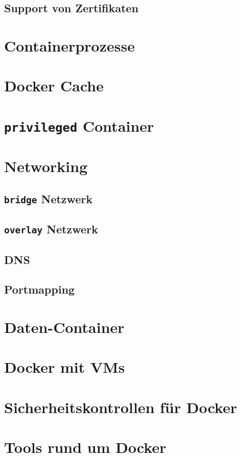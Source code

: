 \documentclass[11pt,a4paper,oneside]{report}
\begin{document}
		\subsection{Support von Zertifikaten}
  \section{Containerprozesse}
	\section{Docker Cache}
	\section{\texttt{privileged} Container}
	\section{Networking}
		\subsection{\texttt{bridge} Netzwerk}
		\subsection{\texttt{overlay} Netzwerk}
		\subsection{DNS}
		\subsection{Portmapping}
	\section{Daten-Container}
	\section{Docker mit VMs}
  \section{Sicherheitskontrollen für Docker}
	\section{Tools rund um Docker}
\end{document}
